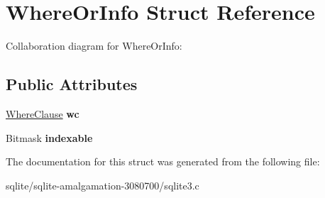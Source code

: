 \hypertarget{struct_where_or_info}{\section{Where\+Or\+Info Struct Reference}
\label{struct_where_or_info}
}


Collaboration diagram for Where\+Or\+Info\+:
\subsection*{Public Attributes}
\begin{DoxyCompactItemize}
\item 
\hypertarget{struct_where_or_info_a45bb04e5ea24ec549f060bc8b210ec71}{\hyperlink{struct_where_clause}{Where\+Clause} {\bfseries wc}}\label{struct_where_or_info_a45bb04e5ea24ec549f060bc8b210ec71}

\item 
\hypertarget{struct_where_or_info_a39777f291e1e516f01b05b71a9805357}{Bitmask {\bfseries indexable}}\label{struct_where_or_info_a39777f291e1e516f01b05b71a9805357}

\end{DoxyCompactItemize}


The documentation for this struct was generated from the following file\+:\begin{DoxyCompactItemize}
\item 
sqlite/sqlite-\/amalgamation-\/3080700/sqlite3.\+c\end{DoxyCompactItemize}
